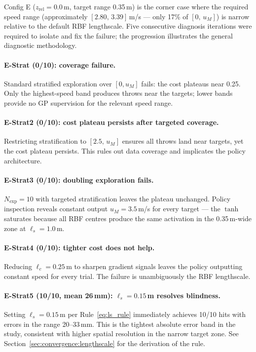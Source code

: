 Config E ($z_{\mathrm{rel}} = 0.0$\,m, target range 0.35\,m) is the corner case where
the required speed range (approximately $[2.80,\, 3.39]$\,m/s --- only 17\% of
$[0,\, u_M]$) is narrow relative to the default RBF lengthscale.
Five consecutive diagnosis iterations were required to isolate and fix the failure;
the progression illustrates the general diagnostic methodology.

\paragraph{E-Strat (0/10): coverage failure.}
Standard stratified exploration over $[0, u_M]$ fails: the cost plateaus near 0.25.
Only the highest-speed band produces throws near the targets; lower bands provide no
GP supervision for the relevant speed range.

\paragraph{E-Strat2 (0/10): cost plateau persists after targeted coverage.}
Restricting stratification to $[2.5,\, u_M]$ ensures all throws land near targets,
yet the cost plateau persists.
This rules out data coverage and implicates the policy architecture.

\paragraph{E-Strat3 (0/10): doubling exploration fails.}
$N_{\mathrm{exp}} = 10$ with targeted stratification leaves the plateau unchanged.
Policy inspection reveals constant output $u_M = 3.5$\,m/s for every target --- the
$\tanh$ saturates because all RBF centres produce the same activation in the
0.35\,m-wide zone at $\ell_s = 1.0$\,m.

\paragraph{E-Strat4 (0/10): tighter cost does not help.}
Reducing $\ell_c = 0.25$\,m to sharpen gradient signals leaves the policy outputting
constant speed for every trial.
The failure is unambiguously the RBF lengthscale.

\paragraph{E-Strat5 (10/10, mean 26\,mm): $\ell_s = 0.15$\,m resolves blindness.}
Setting $\ell_s = 0.15$\,m per Rule~\ref{eq:ls_rule} immediately achieves 10/10 hits
with errors in the range 20--33\,mm.
This is the tightest absolute error band in the study, consistent with higher spatial
resolution in the narrow target zone.
See Section~\ref{sec:convergence:lengthscale} for the derivation of the rule.


